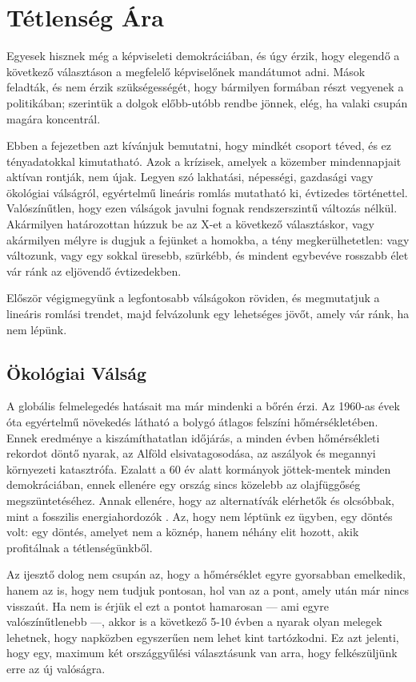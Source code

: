 \section{Tétlenség Ára}

Egyesek hisznek még a képviseleti demokráciában, és úgy érzik, hogy elegendő a
következő választáson a megfelelő képviselőnek mandátumot adni. Mások feladták,
és nem érzik szükségességét, hogy bármilyen formában részt vegyenek a politikában;
szerintük a dolgok előbb-utóbb rendbe jönnek, elég, ha valaki csupán magára koncentrál.

Ebben a fejezetben azt kívánjuk bemutatni, hogy mindkét csoport téved, és ez tényadatokkal
kimutatható.  Azok a krízisek, amelyek a közember mindennapjait aktívan rontják,
nem újak. Legyen szó lakhatási, népességi, gazdasági vagy ökológiai válságról,
egyértelmű lineáris romlás mutatható ki, évtizedes történettel.  Valószínűtlen, hogy
ezen válságok javulni fognak rendszerszintű változás nélkül. Akármilyen határozottan
húzzuk be az X-et a következő választáskor, vagy akármilyen mélyre is dugjuk a fejünket
a homokba, a tény megkerülhetetlen: vagy változunk, vagy egy sokkal üresebb, szürkébb,
és mindent egybevéve rosszabb élet vár ránk az eljövendő évtizedekben.

Először végigmegyünk a legfontosabb válságokon röviden, és megmutatjuk a lineáris
romlási trendet, majd felvázolunk egy lehetséges jövőt, amely vár ránk, ha nem lépünk.


\subsection{Ökológiai Válság}

A globális felmelegedés hatásait ma már mindenki a bőrén érzi. Az 1960-as évek óta
egyértelmű növekedés látható a bolygó átlagos felszíni hőmérsékletében. Ennek
eredménye a kiszámíthatatlan időjárás, a minden évben hőmérsékleti rekordot döntő
nyarak, az Alföld elsivatagosodása, az aszályok és megannyi környezeti katasztrófa. Ezalatt
a 60 év alatt kormányok jöttek-mentek minden demokráciában, ennek ellenére egy
ország sincs közelebb az olajfüggőség megszüntetéséhez. Annak ellenére, hogy az
alternatívák elérhetők és olcsóbbak, mint a fosszilis energiahordozók \cite{renewables_1,
renewables_2}. Az, hogy nem léptünk ez ügyben, egy döntés volt: egy döntés, amelyet nem
a köznép, hanem néhány elit hozott, akik profitálnak a tétlenségünkből.

Az ijesztő dolog nem csupán az, hogy a hőmérséklet egyre gyorsabban emelkedik, hanem az is,
hogy nem tudjuk pontosan, hol van az a pont, amely után már nincs visszaút. Ha nem is érjük el
ezt a pontot hamarosan --- ami egyre valószínűtlenebb ---, akkor is a következő 5-10 évben
a nyarak olyan melegek lehetnek, hogy napközben egyszerűen nem lehet kint tartózkodni. Ez azt
jelenti, hogy egy, maximum két országgyűlési választásunk van arra, hogy felkészüljünk
erre az új valóságra.

